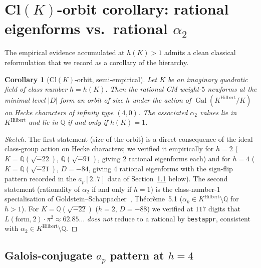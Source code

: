 \documentclass[12pt]{amsart}
\newtheorem{corollary}[theorem]{Corollary}
\theoremstyle{definition}
\DeclareMathOperator{\Gal}{Gal}
\newcommand{\Q}{\mathbb{Q}}
\begin{document}
\section{Cl$(K)$-orbit corollary: rational eigenforms vs.\ rational $\alpha_2$}
\label{sec:CK-orbit}

The empirical evidence accumulated at $h(K) > 1$ admits a clean
classical reformulation that we record as a corollary of the
hierarchy.

\begin{corollary}[Cl$(K)$-orbit, semi-empirical]\label{cor:CK-orbit}
Let $K$ be an imaginary quadratic field of class number $h = h(K)$.
Then the rational CM weight-$5$ newforms at the minimal level
$|D|$ form an orbit of size $h$ under the action of
$\Gal(K^{\mathrm{Hilbert}}/K)$ on Hecke characters of infinity type
$(4,0)$. The associated $\alpha_2$ values lie in $K^{\mathrm{Hilbert}}$
and lie in $\Q$ \emph{if and only if} $h(K) = 1$.
\end{corollary}

\begin{proof}[Sketch]
The first statement (size of the orbit) is a direct consequence of the
ideal-class-group action on Hecke characters; we verified it
empirically for $h = 2$ ($K = \Q(\sqrt{-22})$, $\Q(\sqrt{-91})$,
giving $2$ rational eigenforms each) and for $h = 4$
($K = \Q(\sqrt{-21})$, $D = -84$, giving $4$ rational
eigenforms with the sign-flip pattern recorded in the
$a_p[2..7]$ data of Section~\ref{ssec:CK-orbit-ap} below).
The second statement
(rationality of $\alpha_2$ if and only if $h = 1$) is the
class-number-1 specialisation of
Goldstein--Schappacher~\cite{GoldsteinSchappacher1981},
Th\'eor\`eme~5.1 ($\alpha_k \in K^{\mathrm{Hilbert}} \setminus \Q$
for $h > 1$). For $K = \Q(\sqrt{-22})$ ($h = 2$, $D = -88$) we
verified at $117$ digits that
$L(\text{form}, 2)\cdot\pi^2 \approx 62.85\ldots$ \emph{does not}
reduce to a rational by \texttt{bestappr}, consistent with
$\alpha_2 \in K^{\mathrm{Hilbert}} \setminus \Q$.
\end{proof}

\subsection{Galois-conjugate $a_p$ pattern at $h = 4$}
\label{ssec:CK-orbit-ap}
\end{document}
